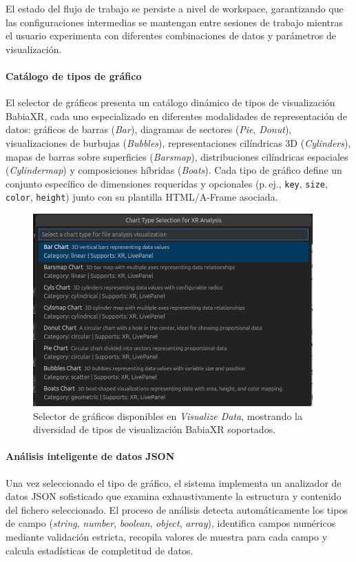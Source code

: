 \documentclass[a4paper, 12pt]{book}
\begin{document}
El estado del flujo de trabajo se persiste a nivel de workspace, garantizando que las configuraciones intermedias se mantengan entre sesiones de trabajo mientras el usuario experimenta con diferentes combinaciones de datos y parámetros de visualización.

\paragraph{Catálogo de tipos de gráfico}
El selector de gráficos presenta un catálogo dinámico de tipos de visualización BabiaXR, cada uno especializado en diferentes modalidades de representación de datos: gráficos de barras (\emph{Bar}), diagramas de sectores (\emph{Pie}, \emph{Donut}), visualizaciones de burbujas (\emph{Bubbles}), representaciones cilíndricas 3D (\emph{Cylinders}), mapas de barras sobre superficies (\emph{Barsmap}), distribuciones cilíndricas espaciales (\emph{Cylindermap}) y composiciones híbridas (\emph{Boats}). Cada tipo de gráfico define un conjunto específico de dimensiones requeridas y opcionales (p.\,ej., \texttt{key}, \texttt{size}, \texttt{color}, \texttt{height}) junto con su plantilla HTML/A-Frame asociada.

\begin{figure}[H]
\centering
\includegraphics[width=0.58\linewidth]{img/graficos_babiaxr.png}
\caption{Selector de gráficos disponibles en \emph{Visualize Data}, mostrando la diversidad de tipos de visualización BabiaXR soportados.}
\label{fig:visualize-chart-selector}
\end{figure}

\paragraph{Análisis inteligente de datos JSON}
Una vez seleccionado el tipo de gráfico, el sistema implementa un analizador de datos JSON sofisticado que examina exhaustivamente la estructura y contenido del fichero seleccionado. El proceso de análisis detecta automáticamente los tipos de campo (\emph{string}, \emph{number}, \emph{boolean}, \emph{object}, \emph{array}), identifica campos numéricos mediante validación estricta, recopila valores de muestra para cada campo y calcula estadísticas de completitud de datos.
\end{document}
